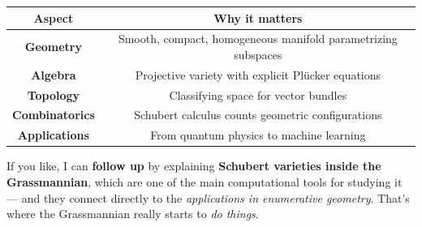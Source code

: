 \documentclass{amsart}
\theoremstyle{plain}
\theoremstyle{definition}
\theoremstyle{remark}
\begin{document}
\begin{table}[h]
	\centering
	\begin{tabular}{|c|c|}
		\hline
		Aspect & Why it matters \\
		\hline
		\textbf{Geometry} & Smooth, compact, homogeneous manifold parametrizing subspaces \\
		\hline
		\textbf{Algebra} & Projective variety with explicit Plücker equations \\
		\hline
		\textbf{Topology} & Classifying space for vector bundles \\
		\hline
		\textbf{Combinatorics} & Schubert calculus counts geometric configurations \\
		\hline
		\textbf{Applications} & From quantum physics to machine learning \\
		\hline
	\end{tabular}
\end{table}
If you like, I can \textbf{follow up} by explaining \textbf{Schubert varieties inside the Grassmannian}, which are one of the main computational tools for studying it — and they connect directly to the \textit{applications in enumerative geometry}. That’s where the Grassmannian really starts to \textit{do things}.
\end{document}
